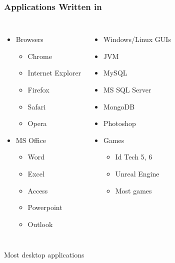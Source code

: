 \begin{frame}
  \frametitle{Applications Written in \cpp}
  \begin{columns}
    \column{5cm}
    \begin{itemize}
      \item Browsers
            \begin{itemize}
              \item Chrome
              \item Internet Explorer
              \item Firefox
              \item Safari
              \item Opera
            \end{itemize}
      \item MS Office
            \begin{itemize}
              \item Word
              \item Excel
              \item Access
              \item Powerpoint
              \item Outlook
            \end{itemize}
    \end{itemize}
    \column{5cm}
    \begin{itemize}
      \item Windows/Linux GUIs
      \item JVM
      \item MySQL
      \item MS SQL Server
      \item MongoDB
      \item Photoshop
      \item Games
            \begin{itemize}
              \item Id Tech 5, 6
              \item Unreal Engine
              \item Most games
            \end{itemize}
    \end{itemize}
  \end{columns}
  \vskip4mm
  \begin{center}
    Most desktop applications
  \end{center}
\end{frame}

